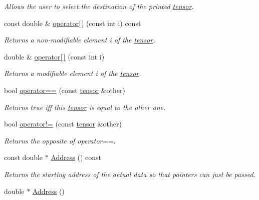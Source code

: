 \begin{DoxyCompactItemize}
\begin{DoxyCompactList}\small\item\em Allows the user to select the destination of the printed \hyperlink{classJKBuilder_1_1tensor}{tensor}. \item\end{DoxyCompactList}\item 
const double \& \hyperlink{classJKBuilder_1_1tensor_a4f0dc1b84b580cec49500c70f87e084a}{operator\mbox{[}$\,$\mbox{]}} (const int i) const 
\begin{DoxyCompactList}\small\item\em Returns a non-\/modifiable element i of the \hyperlink{classJKBuilder_1_1tensor}{tensor}. \item\end{DoxyCompactList}\item 
double \& \hyperlink{classJKBuilder_1_1tensor_a38c9fed6b117f7cf8b76785648d76b62}{operator\mbox{[}$\,$\mbox{]}} (const int i)
\begin{DoxyCompactList}\small\item\em Returns a modifiable element i of the \hyperlink{classJKBuilder_1_1tensor}{tensor}. \item\end{DoxyCompactList}\item 
bool \hyperlink{classJKBuilder_1_1tensor_a10ae0b61e655854d12c6465d2b9e3506}{operator==} (const \hyperlink{classJKBuilder_1_1tensor}{tensor} \&other)
\begin{DoxyCompactList}\small\item\em Returns true iff this \hyperlink{classJKBuilder_1_1tensor}{tensor} is equal to the other one. \item\end{DoxyCompactList}\item 
bool \hyperlink{classJKBuilder_1_1tensor_a9b42dd835ddf2eb1a26b5d525b59b2b8}{operator!=} (const \hyperlink{classJKBuilder_1_1tensor}{tensor} \&other)
\begin{DoxyCompactList}\small\item\em Returns the opposite of operator==. \item\end{DoxyCompactList}\item 
const double $\ast$ \hyperlink{classJKBuilder_1_1tensor_a6a4e024f566d3bf9ba32a349afc5bbcf}{Address} () const 
\begin{DoxyCompactList}\small\item\em Returns the starting address of the actual data so that pointers can just be passed. \item\end{DoxyCompactList}\item 
double $\ast$ \hyperlink{classJKBuilder_1_1tensor_ac982d9eb84092bfc13694448dd824cbc}{Address} ()
\end{DoxyCompactItemize}
